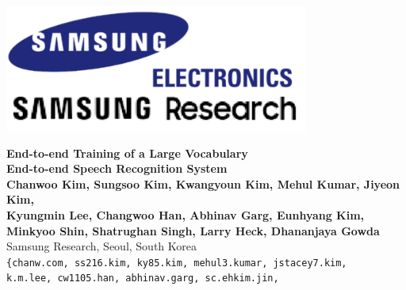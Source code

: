 \documentclass[a0,portrait]{a0poster}
\begin{document}


\begin{minipage}[t]{1.0\linewidth}
\begin{center}
  \begin{minipage}[t]{0.1\textwidth}
    \centering
    \vspace{0pt}
    \includegraphics[width=10cm, valign=t]{samsung_research} %
  \end{minipage} \hfill
  \begin{minipage}[t]{0.79\textwidth}
    \begin{center}
  \huge \color{NavyBlue} 
      \textbf{End-to-end Training of a Large Vocabulary \\ End-to-end Speech Recognition System
      } \\
      \Large \textbf{
      Chanwoo Kim, Sungsoo Kim, Kwangyoun Kim, Mehul Kumar,  Jiyeon Kim, \\ 
      Kyungmin Lee, Changwoo Han, Abhinav Garg, Eunhyang Kim,  \\ 
      Minkyoo Shin, Shatrughan Singh, Larry Heck, Dhananjaya Gowda
      }
  \\
\Large Samsung Research, Seoul, South Korea\\ %
{ \large \tt  \{chanw.com, ss216.kim, ky85.kim, mehul3.kumar, jstacey7.kim,} \\ 
  \large \tt  {k.m.lee, cw1105.han, abhinav.garg, sc.ehkim.jin,} \\

\end{center}
\end{minipage}
\end{center}
\end{minipage}
\end{document}
